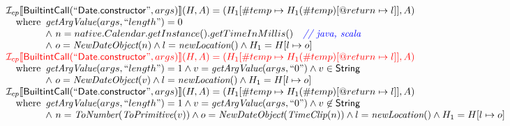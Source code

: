 \[
\begin{array}{l}
\mathcal{I} _{cp}\llbracket \mbox{\textsf{BuiltintCall}}(``\mbox{\textsf{Date.constructor}}",args)\rrbracket(H,A)
  = (H_1[\#temp \mapsto H_1(\#temp)[@return \mapsto l]], A)\\
\quad{\rm where}\begin{array}[t]{l}
  \emph{getArgValue}(args, ``length") = 0\\
  \land\ n = native.Calendar.getInstance().getTimeInMillis() \quad\textit{{\color{blue}// java, scala}}\\
  \land\ o = \emph{NewDateObject}(n) \land l = \emph{newLocation}() \land H_1 = H[l \mapsto o]
  \end{array}\\
  
\color{red} \mathcal{I} _{cp}\llbracket \mbox{\textsf{BuiltintCall}}(``\mbox{\textsf{Date.constructor}}",args)\rrbracket(H,A)
  = (H_1[\#temp \mapsto H_1(\#temp)[@return \mapsto l]], A)\\
\quad{\rm where}\begin{array}[t]{l}
  \emph{getArgValue}(args, ``length") = 1 \land v = \emph{getArgValue}(args, ``0") \land v \in \mbox{\textsf{String}}\\
  \land\ o = \emph{NewDateObject}(v) \land l = \emph{newLocation}() \land H_1 = H[l \mapsto o]
  \end{array}\\ 
  
\mathcal{I} _{cp}\llbracket \mbox{\textsf{BuiltintCall}}(``\mbox{\textsf{Date.constructor}}",args)\rrbracket(H,A)
  = (H_1[\#temp \mapsto H_1(\#temp)[@return \mapsto l]], A)\\
\quad{\rm where}\begin{array}[t]{l}
  \emph{getArgValue}(args, ``length") = 1 \land v = \emph{getArgValue}(args, ``0") \land v \not\in \mbox{\textsf{String}}\\
  \land\ n = \emph{ToNumber}(\emph{ToPrimitive}(v))
  \land o = \emph{NewDateObject}(\emph{TimeClip}(n)) \land l = \emph{newLocation}() \land H_1 = H[l \mapsto o]
  \end{array}\\
  

\end{array}\]

